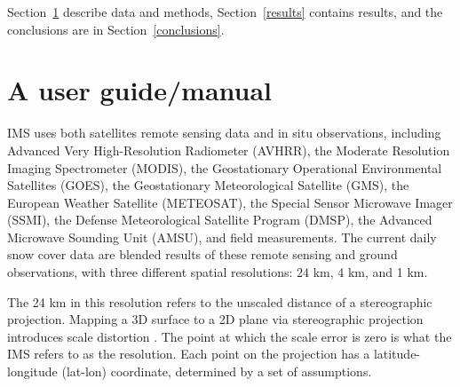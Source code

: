 Section~\ref{dataAndMethods} describe data and methods, Section~\ref{results} contains results, and the conclusions are in Section~\ref{conclusions}. 

\section{A user guide/manual}\label{dataAndMethods}


IMS \cite{NIC} uses both satellites remote sensing data and in situ observations,
including Advanced Very High-Resolution Radiometer
(AVHRR), the Moderate Resolution Imaging Spectrometer
(MODIS), the Geostationary Operational Environmental
Satellites (GOES), the Geostationary Meteorological
Satellite (GMS), the European Weather Satellite
(METEOSAT), the Special Sensor Microwave Imager
(SSMI), the Defense Meteorological Satellite Program
(DMSP), the Advanced Microwave Sounding Unit
(AMSU), and field measurements. The current daily snow cover data 
are blended results of these remote sensing and ground observations, with three different spatial resolutions: 24 km, 
4 km, and 1 km. 

The 24 km in this resolution refers to the unscaled distance of a stereographic projection. Mapping a 3D surface to a 2D plane via stereographic projection introduces scale distortion \cite{snyder1987map}. The point at which the scale error is zero is what the IMS refers to as the resolution. Each point on the projection has a latitude-longitude (lat-lon) coordinate, determined by a set of assumptions. 



